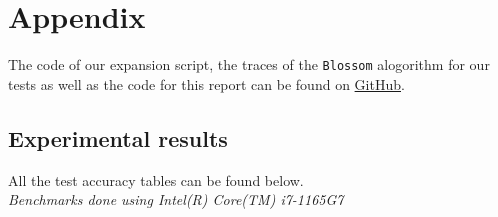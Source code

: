\documentclass[12pt]{report}
\theoremstyle{definition}
\theoremstyle{definition}
\theoremstyle{definition}
\begin{document}
\nocite{*}





\appendix
\chapter*{Appendix}
The code of our expansion script, the traces of the \texttt{Blossom} alogorithm for our tests as well as the code for
this report can be found on \href{https://github.com/Selarow/blossom}{GitHub}.


\section*{Experimental results}
All the test accuracy tables can be found below.\\
\it Benchmarks done using Intel(R) Core(TM) i7-1165G7
\end{document}
